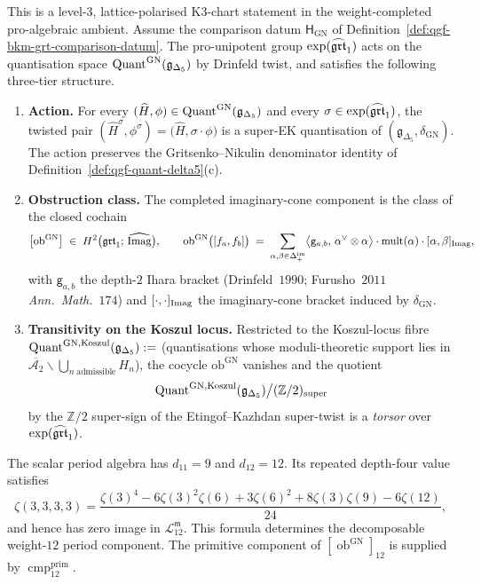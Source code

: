 \begin{theorem}
\label{thm:qgf-grt1-bkm-transitivity}
This is a level-$3$, lattice-polarised K$3$-chart statement in the
weight-completed pro-algebraic ambient.  Assume the comparison datum $\mathsf H_{\mathrm{GN}}$ of
Definition~\ref{def:qgf-bkm-grt-comparison-datum}.
The pro-unipotent group $\exp(\widehat{\mathfrak{grt}}_1)$ acts on the
quantisation space $\mathrm{Quant}^{\mathrm{GN}}(\mathfrak g_{\Delta_5})$
by Drinfeld twist, and satisfies the following three-tier structure.
\begin{enumerate}
\item[(i)]\textbf{Action.} For every $(\widehat H, \phi) \in
\mathrm{Quant}^{\mathrm{GN}}(\mathfrak g_{\Delta_5})$ and every
$\sigma \in \exp(\widehat{\mathfrak{grt}}_1)$, the twisted pair
$(\widehat H^\sigma, \phi^\sigma) = \bigl(\widehat H, \sigma\cdot\phi\bigr)$
is a super-EK quantisation of
$(\mathfrak g_{\Delta_5}, \delta_{\mathrm{GN}})$. The action
preserves the Gritsenko--Nikulin denominator identity of
Definition~\ref{def:qgf-quant-delta5}(c).
\item[(ii)]\textbf{Obstruction class.} The completed imaginary-cone
component is the class of the closed cochain
\[
\bigl[\mathrm{ob}^{\mathrm{GN}}\bigr]
\;\in\; H^2\bigl(\mathfrak{grt}_1;\,\widehat{\mathrm{Imag}}\bigr),
\qquad
\mathrm{ob}^{\mathrm{GN}}\bigl([f_a, f_b]\bigr)
\;=\;
\sum_{\alpha, \beta\in\Delta_+^{\mathrm{im}}}
\bigl\langle \mathsf g_{a, b},\,\alpha^\vee\otimes\alpha\bigr\rangle\cdot
\mathrm{mult}(\alpha)\cdot [\alpha, \beta]_{\mathrm{Imag}},
\]
with $\mathsf g_{a, b}$ the depth-$2$ Ihara bracket
(Drinfeld~$1990$; Furusho~$2011$ \emph{Ann.\ Math.}~$174$) and
$[\cdot, \cdot]_{\mathrm{Imag}}$ the imaginary-cone bracket induced by
$\delta_{\mathrm{GN}}$.
\item[(iii)]\textbf{Transitivity on the Koszul locus.} Restricted to
the Koszul-locus fibre
$\mathrm{Quant}^{\mathrm{GN, Koszul}}(\mathfrak g_{\Delta_5}) := $
(quantisations whose moduli-theoretic support lies in
$\overline{\mathcal A_2}\smallsetminus\bigcup_{n\;\text{admissible}}
H_n$), the cocycle $\mathrm{ob}^{\mathrm{GN}}$ vanishes and the
quotient
\[
\mathrm{Quant}^{\mathrm{GN, Koszul}}(\mathfrak g_{\Delta_5})\big/
(\mathbb Z/2)_{\mathrm{super}}
\]
by the $\mathbb Z/2$ super-sign of the Etingof--Kazhdan super-twist
is a \emph{torsor} over $\exp(\widehat{\mathfrak{grt}}_1)$.
\end{enumerate}

The scalar period algebra has
$d_{11}=9$ and $d_{12}=12$.  Its repeated depth-four value satisfies
\begin{equation}\label{eq:qgf-zeta3333-newton}
 \zeta(3,3,3,3)
 =\frac{\zeta(3)^4-6\zeta(3)^2\zeta(6)+3\zeta(6)^2
 +8\zeta(3)\zeta(9)-6\zeta(12)}{24},
\end{equation}
and hence has zero image in $\mathcal L^{\mathfrak m}_{12}$.  This
formula determines the decomposable weight-$12$ period component.  The
primitive component of
$[\operatorname{ob}^{\mathrm{GN}}]_{12}$ is supplied by
$\operatorname{cmp}^{\mathrm{prim}}_{12}$.
\end{theorem}


